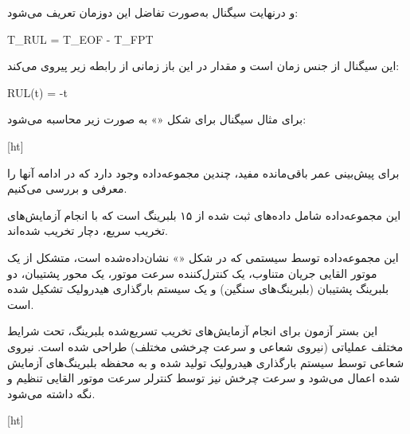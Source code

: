و درنهایت سیگنال  به‌صورت تفاضل این دوزمان تعریف می‌شود:

T_{RUL} = T_{EOF} - T_{FPT}

این سیگنال از جنس زمان است و مقدار  در این باز زمانی از رابطه زیر پیروی می‌کند:

RUL(t) = -t


برای مثال سیگنال  برای شکل «» به صورت زیر محاسبه می‌شود:

[ht]






برای پیش‌بینی عمر باقی‌مانده مفید، چندین مجموعه‌داده وجود دارد که در ادامه آنها را معرفی و بررسی می‌کنیم.

این مجموعه‌داده شامل داده‌های ثبت شده از ۱۵ بلبرینگ است که با انجام آزمایش‌های تخریب سریع، دچار تخریب شده‌اند.  



این مجموعه‌داده توسط سیستمی که در شکل «» نشان‌داده‌شده است، متشکل از یک موتور القایی جریان متناوب، یک کنترل‌کننده سرعت موتور، یک محور پشتیبان، دو بلبرینگ پشتیبان (بلبرینگ‌های سنگین) و یک سیستم بارگذاری هیدرولیک تشکیل شده است.

این بستر آزمون برای انجام آزمایش‌های تخریب تسریع‌شده بلبرینگ‌، تحت شرایط مختلف عملیاتی (نیروی شعاعی و سرعت چرخشی مختلف) طراحی شده است. نیروی شعاعی توسط سیستم بارگذاری هیدرولیک تولید شده و به محفظه بلبرینگ‌های آزمایش شده اعمال می‌شود و سرعت چرخش نیز توسط کنترلر سرعت موتور القایی  تنظیم و نگه داشته می‌شود.








[ht]




